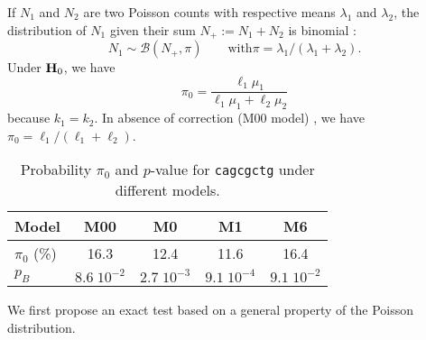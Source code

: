 \documentclass[dvips, lscape]{foils}
\newcommand{\Bcal}{\mathcal{B}}
\newcommand{\Hbf}{{\bf H}}
\newcommand{\textblue}[1]{\textcolor{blue}{#1}}
\newcommand{\subsection}[1]{\noindent{\large \textblue{#1}}}
\begin{document}
If $N_1$ and $N_2$ are two Poisson counts with respective means
$\lambda_1$ and $\lambda_2$, the distribution of $N_1$ given their sum
$N_+ := N_1+N_2$ is binomial : 
$$
N_1 \sim \Bcal(N_+, \pi) \qquad \text{with} \pi = \lambda_1 /
(\lambda_1 +\lambda_2). 
$$  
Under $\Hbf_0$, we have
\begin{equation} \label{Eq:PiBinom}
\pi_0 
= \frac{\ell_1 \mu_1}{\ell_1 \mu_1 + \ell_2 \mu_2}
\end{equation}
because $k_1 = k_2$.  In absence of correction (M00 model) , we have
$\pi_0 = \ell_1 / (\ell_1 +\ell_2)$. 

\begin{table}[h]
  \begin{center}
    \begin{tabular}{lcccc}
      Model          & M00 & M0 & M1 & M6  \\
      \hline
      $\pi_0$ (\%) & 16.3 & 12.4 & 11.6 & 16.4 \\
      $p_B$ & $8.6\;10^{-2}$ & $2.7\;10^{-3}$ & $9.1\;10^{-4}$ & $9.1\;10^{-2}$\\
    \end{tabular}
    \caption{Probability $\pi_0$ and $p$-value for {\tt cagcgctg}
      under different models.}
    \label{Tab:EN-cagcgctg}
  \end{center}
\end{table}

We first propose an exact test based on a general property of the
Poisson distribution. 
\newpage
\subsection{Likelihood ratio test (LRT)}
\end{document}

